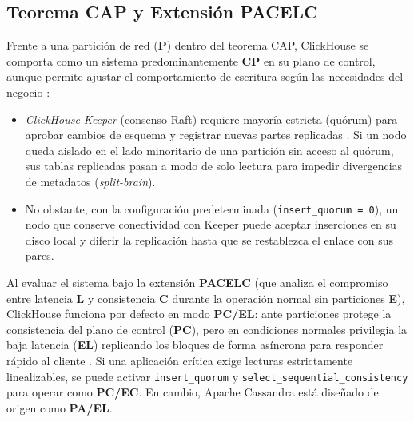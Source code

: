 \documentclass[12pt,a4paper]{article}
\begin{document}
\subsection{Teorema CAP y Extensión PACELC}
Frente a una partición de red (\textbf{P}) dentro del teorema CAP, ClickHouse se comporta como un sistema predominantemente \textbf{CP} en su plano de control, aunque permite ajustar el comportamiento de escritura según las necesidades del negocio \cite{vansteen2023distributed, han2024palf}:
\begin{itemize}[leftmargin=1.2cm]
    \item \textit{ClickHouse Keeper} (consenso Raft) requiere mayoría estricta (quórum) para aprobar cambios de esquema y registrar nuevas partes replicadas \cite{han2024palf}. Si un nodo queda aislado en el lado minoritario de una partición sin acceso al quórum, sus tablas replicadas pasan a modo de solo lectura para impedir divergencias de metadatos (\textit{split-brain}).
    \item No obstante, con la configuración predeterminada (\texttt{insert\_quorum = 0}), un nodo que conserve conectividad con Keeper puede aceptar inserciones en su disco local y diferir la replicación hasta que se restablezca el enlace con sus pares.
\end{itemize}

Al evaluar el sistema bajo la extensión \textbf{PACELC} (que analiza el compromiso entre latencia \textbf{L} y consistencia \textbf{C} durante la operación normal sin particiones \textbf{E}), ClickHouse funciona por defecto en modo \textbf{PC/EL}: ante particiones protege la consistencia del plano de control (\textbf{PC}), pero en condiciones normales privilegia la baja latencia (\textbf{EL}) replicando los bloques de forma asíncrona para responder rápido al cliente \cite{newman2021building}. Si una aplicación crítica exige lecturas estrictamente linealizables, se puede activar \texttt{insert\_quorum} y \texttt{select\_sequential\_consistency} para operar como \textbf{PC/EC}. En cambio, Apache Cassandra está diseñado de origen como \textbf{PA/EL}.
\end{document}
